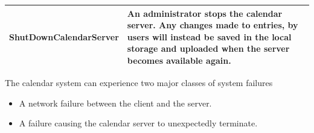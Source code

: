 \begin{center}
    \begin{tabular}{ | l | p{10cm} |}
    \hline
    ShutDownCalendarServer & An administrator stops the calendar server. Any changes made to entries, by users will instead be saved in the local storage and uploaded when the server becomes available again. \\ \hline
    \end{tabular}
\end{center}


The calendar system can experience two major classes of system failures
\begin{itemize}
\item A network failure between the client and the server.
\item A failure causing the calendar server to unexpectedly terminate.
\end{itemize}
